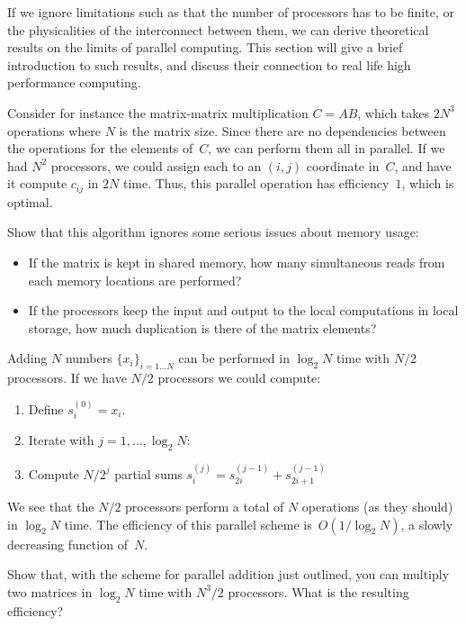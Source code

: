 
If we ignore limitations such as that the number of processors has to
be finite, or the physicalities of the  interconnect between them, we can
derive theoretical results on the limits of parallel computing. This
section will give a brief introduction to such results, and discuss
their connection to real life high performance computing.

Consider for instance the matrix-matrix multiplication
$C=AB$, which takes $2N^3$ operations where $N$ is the matrix
size. Since there are no dependencies between the operations for the
elements of~$C$, we can perform them all in parallel. If we had $N^2$
processors, we could assign each to an $(i,j)$ coordinate in~$C$, and
have it compute $c_{ij}$ in $2N$ time. Thus, this parallel operation
has efficiency~$1$, which is optimal.

\begin{exercise}
  Show that this algorithm ignores some serious issues about memory
  usage:
  \begin{itemize}
  \item If the matrix is kept in shared memory, how many simultaneous
    reads from each memory locations are performed?
  \item If the processors keep the input and output to the local
    computations in  local storage, how much duplication
    is there of the matrix elements?
  \end{itemize}
\end{exercise}

Adding $N$ numbers $\{x_i\}_{i=1\ldots N}$ can be performed in
$\log_2 N$ time with $N/2$ processors.
If we have $N/2$ processors we
could compute:
\begin{enumerate}
\item Define $s^{(0)}_i = x_i$.
\item Iterate with $j=1,\ldots,\log_2 N$:
\item Compute $N/2^j$ partial sums $s^{(j)}_i=s^{(j-1)}_{2i}+s^{(j-1)}_{2i+1}$
\end{enumerate}
We see that the $N/2$ processors perform a total of $N$ operations (as
they should) in $\log_2N$ time. The efficiency of this parallel scheme
is~$O(1/\log_2N)$, a slowly decreasing function of~$N$.  
\begin{exercise}
  Show that, with the scheme for parallel addition just outlined, you
  can multiply two matrices in $\log_2 N$ time with $N^3/2$
  processors. What is the resulting efficiency?
\end{exercise}


